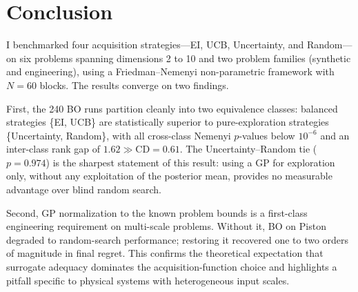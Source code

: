 \section{Conclusion}
\label{sec:conclusion}

I benchmarked four acquisition strategies—EI, UCB, Uncertainty, and
Random—on six problems spanning dimensions 2 to 10 and two problem
families (synthetic and engineering), using a Friedman–Nemenyi
non-parametric framework with $N = 60$ blocks.
The results converge on two findings.

First, the 240 BO runs partition cleanly into two equivalence classes:
balanced strategies \{EI, UCB\} are statistically superior to
pure-exploration strategies \{Uncertainty, Random\}, with all
cross-class Nemenyi $p$-values below $10^{-6}$ and an inter-class rank
gap of $1.62 \gg \mathrm{CD} = 0.61$.
The Uncertainty–Random tie ($p = 0.974$) is the sharpest statement of
this result: using a GP for exploration only, without any exploitation
of the posterior mean, provides no measurable advantage over blind
random search.

Second, GP normalization to the known problem bounds is a
first-class engineering requirement on multi-scale problems.
Without it, BO on Piston degraded to random-search performance;
restoring it recovered one to two orders of magnitude in final regret.
This confirms the theoretical expectation that surrogate adequacy
dominates the acquisition-function choice and highlights a pitfall
specific to physical systems with heterogeneous input scales.
